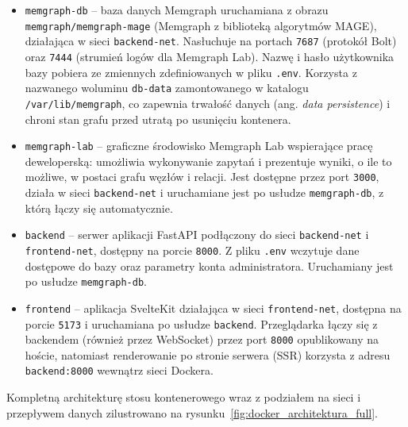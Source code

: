 \documentclass[twoside]{projektInzynierskiMS1z}
\begin{document}
\begin{itemize}
    \item \texttt{memgraph-db} -- baza danych Memgraph uruchamiana z obrazu
    \texttt{memgraph/memgraph-mage} (Memgraph z biblioteką algorytmów MAGE),
    działająca w sieci \texttt{backend-net}. Nasłuchuje na portach
    \texttt{7687} (protokół Bolt) oraz \texttt{7444} (strumień logów dla
    Memgraph Lab). Nazwę i hasło użytkownika bazy pobiera ze zmiennych
    zdefiniowanych w pliku \texttt{.env}. Korzysta z nazwanego woluminu
    \texttt{db-data} zamontowanego w katalogu \texttt{/var/lib/memgraph}, co
    zapewnia trwałość danych (ang. \emph{data persistence}) i chroni stan grafu
    przed utratą po usunięciu kontenera.
    \item \texttt{memgraph-lab} -- graficzne środowisko Memgraph Lab wspierające
    pracę deweloperską: umożliwia wykonywanie zapytań i prezentuje wyniki,
    o ile to możliwe, w postaci grafu węzłów i relacji. Jest dostępne przez port
    \texttt{3000}, działa w sieci \texttt{backend-net} i uruchamiane jest po
    usłudze \texttt{memgraph-db}, z którą łączy się automatycznie.
    \item \texttt{backend} -- serwer aplikacji FastAPI podłączony do sieci
    \texttt{backend-net} i \texttt{frontend-net}, dostępny na porcie
    \texttt{8000}. Z pliku \texttt{.env} wczytuje dane dostępowe do bazy oraz
    parametry konta administratora. Uruchamiany jest po usłudze
    \texttt{memgraph-db}.
    \item \texttt{frontend} -- aplikacja SvelteKit działająca w sieci
    \texttt{frontend-net}, dostępna na porcie \texttt{5173} i uruchamiana po
    usłudze \texttt{backend}. Przeglądarka łączy się z backendem (również przez
    WebSocket) przez port \texttt{8000} opublikowany na hoście, natomiast
    renderowanie po stronie serwera (SSR) korzysta z adresu
    \texttt{backend:8000} wewnątrz sieci Dockera.
\end{itemize}

Kompletną architekturę stosu kontenerowego wraz z podziałem na sieci i przepływem danych zilustrowano na rysunku~\ref{fig:docker_architektura_full}.
\end{document}
